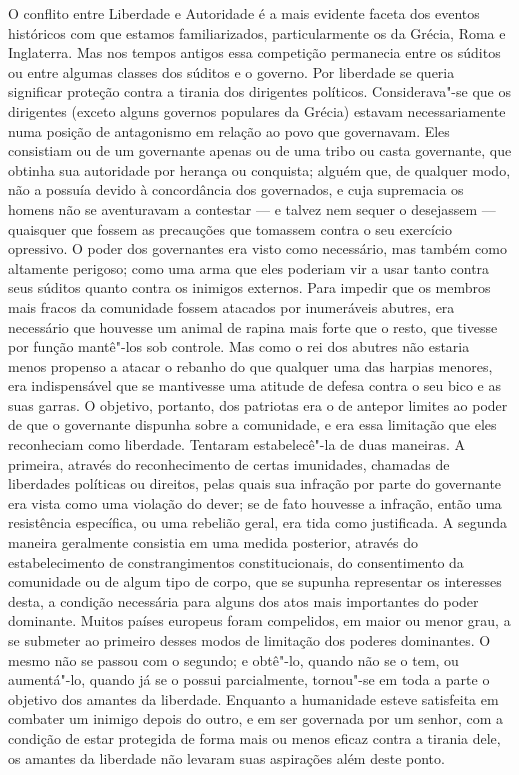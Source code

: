 O conflito entre Liberdade e Autoridade é a mais evidente faceta dos eventos históricos com que estamos familiarizados, particularmente os da Grécia,
Roma e Inglaterra. Mas nos tempos antigos essa competição permanecia
entre os súditos ou entre algumas classes dos súditos e o governo. Por
liberdade se queria significar proteção contra a tirania dos dirigentes
políticos. Considerava"-se que os dirigentes (exceto alguns governos
populares da Grécia) estavam necessariamente numa posição
de antagonismo em relação ao povo que governavam. Eles consistiam ou
de um governante apenas ou de uma tribo ou casta governante, que obtinha sua
autoridade por herança ou conquista; alguém que, de qualquer modo, não a
possuía devido à concordância dos governados, e cuja supremacia os homens
não se aventuravam a contestar ---  e talvez nem sequer o desejassem --- 
quaisquer que fossem as precauções que tomassem contra o seu exercício
opressivo. O poder dos governantes era visto como necessário, mas também como
altamente perigoso; como uma arma que eles poderiam vir a usar tanto
contra seus súditos quanto contra os inimigos externos. Para impedir
que os membros mais fracos da comunidade fossem atacados por
inumeráveis abutres, era necessário que houvesse um animal de rapina
mais forte que o resto, que tivesse por função mantê"-los sob
controle. Mas como o rei dos abutres não estaria menos propenso a
atacar o rebanho do que qualquer uma das harpias menores, era indispensável
que se mantivesse uma atitude de defesa contra o seu bico e as suas garras. O
objetivo, portanto, dos patriotas era o de antepor limites ao poder de que
o governante dispunha sobre a comunidade, e era essa
limitação que eles reconheciam como liberdade. Tentaram estabelecê"-la de
duas maneiras. A primeira, através do reconhecimento de certas
imunidades, chamadas de liberdades políticas ou direitos, pelas quais sua 
infração por parte do governante era vista como uma violação do dever; se
de fato houvesse a infração, então uma resistência específica, ou uma
rebelião geral, era tida como justificada. A segunda maneira geralmente
consistia em uma medida posterior, através do estabelecimento de constrangimentos
constitucionais, do consentimento da comunidade ou de algum
tipo de corpo, que se supunha representar os interesses desta,
a condição necessária para alguns dos atos mais importantes do poder
dominante. Muitos países europeus foram compelidos, em maior 
ou menor grau, a se submeter ao primeiro desses modos de 
limitação dos poderes dominantes. O mesmo não se passou com o segundo; e obtê"-lo, quando não
se o tem, ou aumentá"-lo, quando já se o possui parcialmente, tornou"-se
em toda a parte o objetivo dos amantes da liberdade. Enquanto
a humanidade esteve satisfeita em combater um inimigo depois do outro, e em ser
governada por um senhor, com a condição de estar
protegida de forma mais ou menos eficaz contra a tirania dele, os amantes da liberdade não levaram suas
aspirações além deste ponto.

